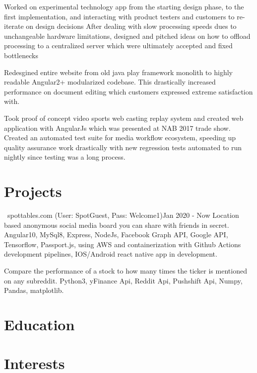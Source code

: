 \documentclass{my_resume}
\begin{document}
\workitemstwo
{Worked on experimental technology app from the starting design phase, to the first implementation, and interacting
with product testers and customers to re-iterate on design decisions}
{After dealing with slow processing speeds dues to unchangeable hardware limitations, designed and pitched ideas on how to offload
processing to a centralized server which were ultimately accepted and fixed bottlenecks}

\workitemsone
{Redesgined entire website from old java play framework monolith to highly readable Angular2+ modularized codebase. This drastically increased performance
 on document editing which customers expressed extreme satisfaction with.}

\workitemstwo
{Took proof of concept video sports web casting replay system and created web application with AngularJs
 which was presented at NAB 2017 trade show.}
{Created an automated test suite for media workflow ecosystem, speeding up quality assurance work drastically with new regression tests
 automated to run nightly since testing was a long process.}

\section{Projects}

{\faChrome~spottables.com (User: SpotGuest, Pass: Welcome1)}{Jan 2020 - Now}
\projectitem
{Location based anonymous social media board you can share with friends in secret.}
{Angular10, MySql8, Express, NodeJs, Facebook Graph API, Google API, Tensorflow, Passport.js,
  using AWS and containerization with Github Actions development pipelines, IOS/Android react native app in development.}

\projectitem
{Compare the performance of a stock to how many times the ticker is mentioned on any subreddit.}
{Python3, yFinance Api, Reddit Api, Pushshift Api, Numpy, Pandas, matplotlib.}

\section{Education}

\section{Interests}
\end{document}
